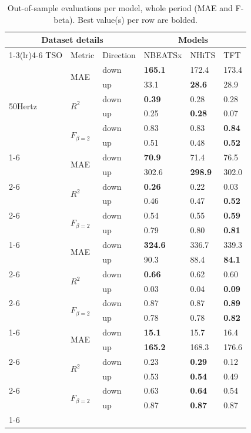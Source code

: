 \begin{table}
\caption{Out-of-sample evaluations per model, whole period (MAE and F-beta). Best value(s) per row are bolded.}
\begin{tabular}{llllll}
\toprule
\multicolumn{3}{c}{Dataset details} & \multicolumn{3}{c}{Models} \\
\cmidrule(lr){1-3}\cmidrule(lr){4-6}
TSO & Metric & Direction & NBEATSx & NHiTS & TFT \\
\midrule
\multirow[t]{6}{*}{50Hertz} & \multirow[t]{2}{*}{MAE} & down & \textbf{165.1} & 172.4 & 173.4 \\
 &  & up & 33.1 & \textbf{28.6} & 28.9 \\
\cline{2-6}
 & \multirow[t]{2}{*}{$R^2$} & down & \textbf{0.39} & 0.28 & 0.28 \\
 &  & up & 0.25 & \textbf{0.28} & 0.07 \\
\cline{2-6}
 & \multirow[t]{2}{*}{$F_{\beta=2}$} & down & 0.83 & 0.83 & \textbf{0.84} \\
 &  & up & 0.51 & 0.48 & \textbf{0.52} \\
\cline{1-6} \cline{2-6}
\multirow[t]{6}{*}{Amprion} & \multirow[t]{2}{*}{MAE} & down & \textbf{70.9} & 71.4 & 76.5 \\
 &  & up & 302.6 & \textbf{298.9} & 302.0 \\
\cline{2-6}
 & \multirow[t]{2}{*}{$R^2$} & down & \textbf{0.26} & 0.22 & 0.03 \\
 &  & up & 0.46 & 0.47 & \textbf{0.52} \\
\cline{2-6}
 & \multirow[t]{2}{*}{$F_{\beta=2}$} & down & 0.54 & 0.55 & \textbf{0.59} \\
 &  & up & 0.79 & 0.80 & \textbf{0.81} \\
\cline{1-6} \cline{2-6}
\multirow[t]{6}{*}{TenneT DE} & \multirow[t]{2}{*}{MAE} & down & \textbf{324.6} & 336.7 & 339.3 \\
 &  & up & 90.3 & 88.4 & \textbf{84.1} \\
\cline{2-6}
 & \multirow[t]{2}{*}{$R^2$} & down & \textbf{0.66} & 0.62 & 0.60 \\
 &  & up & 0.03 & 0.04 & \textbf{0.09} \\
\cline{2-6}
 & \multirow[t]{2}{*}{$F_{\beta=2}$} & down & 0.87 & 0.87 & \textbf{0.89} \\
 &  & up & 0.78 & 0.78 & \textbf{0.82} \\
\cline{1-6} \cline{2-6}
\multirow[t]{6}{*}{TransnetBW} & \multirow[t]{2}{*}{MAE} & down & \textbf{15.1} & 15.7 & 16.4 \\
 &  & up & \textbf{165.2} & 168.3 & 176.6 \\
\cline{2-6}
 & \multirow[t]{2}{*}{$R^2$} & down & 0.23 & \textbf{0.29} & 0.12 \\
 &  & up & 0.53 & \textbf{0.54} & 0.49 \\
\cline{2-6}
 & \multirow[t]{2}{*}{$F_{\beta=2}$} & down & 0.63 & \textbf{0.64} & 0.54 \\
 &  & up & 0.87 & \textbf{0.87} & 0.87 \\
\cline{1-6} \cline{2-6}
\bottomrule
\end{tabular}
\end{table}
